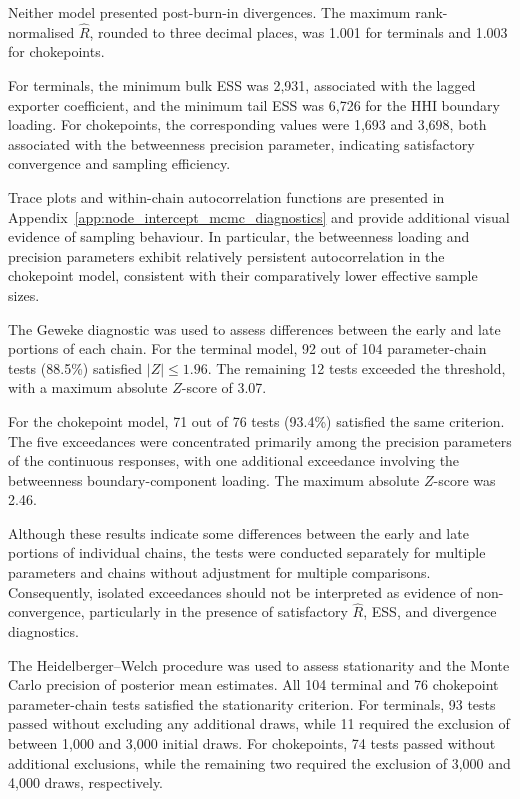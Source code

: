 \documentclass[pdftex,12pt,openright,a4paper,oneside]{book}
\begin{document}
Neither model presented post-burn-in divergences. 
The maximum rank-normalised $\widehat{R}$, rounded to three 
decimal places, was 1.001 for terminals and 1.003 for chokepoints.

For terminals, the minimum bulk ESS
was 2,931, associated with the
lagged exporter coefficient, and the minimum tail ESS was 6,726 for the HHI boundary loading.
For chokepoints, the corresponding values were
1,693 and 3,698, both associated with the
betweenness precision parameter, indicating satisfactory convergence
and sampling efficiency.

Trace plots and within-chain autocorrelation functions are presented in
Appendix~\ref{app:node_intercept_mcmc_diagnostics} and
provide additional visual evidence of sampling
behaviour. In particular, the betweenness loading
and precision parameters exhibit relatively
persistent autocorrelation in the chokepoint model,
consistent with their comparatively lower effective sample sizes.

The Geweke diagnostic was used to assess differences between 
the early and late portions of each chain. For the terminal model, 
92 out of 104 parameter-chain tests (88.5\%) satisfied $|Z|\leq 1.96$. 
The remaining 12 tests exceeded the threshold, with a maximum absolute $Z$-score of 3.07.

For the chokepoint model, 71 out of 76 tests (93.4\%) satisfied the same 
criterion. The five exceedances were concentrated primarily among the 
precision parameters of the continuous responses, with one additional 
exceedance involving the betweenness boundary-component loading. 
The maximum absolute $Z$-score was 2.46.

Although these results indicate some differences
between the early and late portions of individual
chains, the tests were conducted separately for
multiple parameters and chains without adjustment
for multiple comparisons. Consequently, isolated
exceedances should not be interpreted as evidence of non-convergence,
particularly in the presence of satisfactory
$\widehat{R}$, ESS, and divergence diagnostics.

The Heidelberger--Welch procedure was used
to assess stationarity and the Monte Carlo
precision of posterior mean estimates.
All 104 terminal and 76 chokepoint
parameter-chain tests satisfied the
stationarity criterion. For terminals, 93 tests passed without
excluding any additional draws, while
11 required the exclusion of between
1,000 and 3,000 initial draws.
For chokepoints, 74 tests passed without
additional exclusions, while the remaining
two required the exclusion of 3,000 and
4,000 draws, respectively.
\end{document}
